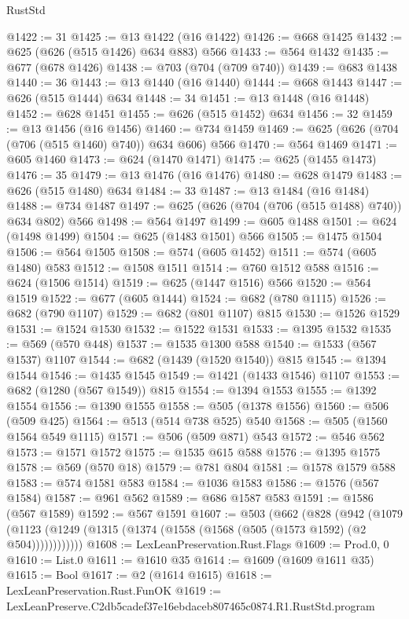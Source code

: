 \begin{lexlean}{RustStd}
\begin{coremodule}
@1422 := 31
@1425 := @13 @1422 (@16 @1422)
@1426 := @668 @1425
@1432 := @625 (@626 (@515 @1426) @634 @883) @566
@1433 := @564 @1432
@1435 := @677 (@678 @1426)
@1438 := @703 (@704 (@709 @740))
@1439 := @683 @1438
@1440 := 36
@1443 := @13 @1440 (@16 @1440)
@1444 := @668 @1443
@1447 := @626 (@515 @1444) @634
@1448 := 34
@1451 := @13 @1448 (@16 @1448)
@1452 := @628 @1451
@1455 := @626 (@515 @1452) @634
@1456 := 32
@1459 := @13 @1456 (@16 @1456)
@1460 := @734 @1459
@1469 := @625 (@626 (@704 (@706 (@515 @1460) @740)) @634 @606) @566
@1470 := @564 @1469
@1471 := @605 @1460
@1473 := @624 (@1470 @1471)
@1475 := @625 (@1455 @1473)
@1476 := 35
@1479 := @13 @1476 (@16 @1476)
@1480 := @628 @1479
@1483 := @626 (@515 @1480) @634
@1484 := 33
@1487 := @13 @1484 (@16 @1484)
@1488 := @734 @1487
@1497 := @625 (@626 (@704 (@706 (@515 @1488) @740)) @634 @802) @566
@1498 := @564 @1497
@1499 := @605 @1488
@1501 := @624 (@1498 @1499)
@1504 := @625 (@1483 @1501) @566
@1505 := @1475 @1504
@1506 := @564 @1505
@1508 := @574 (@605 @1452)
@1511 := @574 (@605 @1480) @583
@1512 := @1508 @1511
@1514 := @760 @1512 @588
@1516 := @624 (@1506 @1514)
@1519 := @625 (@1447 @1516) @566
@1520 := @564 @1519
@1522 := @677 (@605 @1444)
@1524 := @682 (@780 @1115)
@1526 := @682 (@790 @1107)
@1529 := @682 (@801 @1107) @815
@1530 := @1526 @1529
@1531 := @1524 @1530
@1532 := @1522 @1531
@1533 := @1395 @1532
@1535 := @569 (@570 @448)
@1537 := @1535 @1300 @588
@1540 := @1533 (@567 @1537) @1107
@1544 := @682 (@1439 (@1520 @1540)) @815
@1545 := @1394 @1544
@1546 := @1435 @1545
@1549 := @1421 (@1433 @1546) @1107
@1553 := @682 (@1280 (@567 @1549)) @815
@1554 := @1394 @1553
@1555 := @1392 @1554
@1556 := @1390 @1555
@1558 := @505 (@1378 @1556)
@1560 := @506 (@509 @425)
@1564 := @513 (@514 @738 @525) @540
@1568 := @505 (@1560 @1564 @549 @1115)
@1571 := @506 (@509 @871) @543
@1572 := @546 @562
@1573 := @1571 @1572
@1575 := @1535 @615 @588
@1576 := @1395 @1575
@1578 := @569 (@570 @18)
@1579 := @781 @804
@1581 := @1578 @1579 @588
@1583 := @574 @1581 @583
@1584 := @1036 @1583
@1586 := @1576 (@567 @1584)
@1587 := @961 @562
@1589 := @686 @1587 @583
@1591 := @1586 (@567 @1589)
@1592 := @567 @1591
@1607 := @503
    (@662
      (@828
        (@942
          (@1079 (@1123 (@1249 (@1315 (@1374 (@1558 (@1568 (@505 (@1573 @1592) (@2 @504))))))))))))
@1608 := LexLeanPreservation.Rust.Flags
@1609 := Prod.{0, 0}
@1610 := List.{0}
@1611 := @1610 @35
@1614 := @1609 (@1609 @1611 @35)
@1615 := Bool
@1617 := @2 (@1614 @1615)
@1618 := LexLeanPreservation.Rust.FunOK
@1619 := LexLeanPreserve.C2db5cadef37e16ebdaceb807465c0874.R1.RustStd.program

\end{coremodule}
\end{lexlean}
